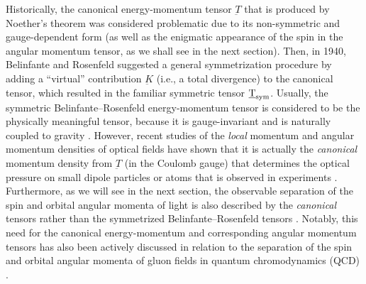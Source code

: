 \documentclass[1p,sort&compress]{elsarticle}
\numberwithin{equation}{section}
\begin{document}
Historically, the canonical energy-momentum tensor $\underbar{T}$ that is produced by Noether's theorem was considered problematic due to its non-symmetric and gauge-dependent form (as well as the enigmatic appearance of the spin in the angular momentum tensor, as we shall see in the next section).  Then, in 1940, Belinfante and Rosenfeld \cite{Belinfante1939,Belinfante1940,Rosenfeld1940} suggested a general symmetrization procedure by adding a ``virtual'' contribution $\underbar{K}$ (i.e., a total divergence) to the canonical tensor, which resulted in the familiar symmetric tensor $\underbar{T}_{\rm sym}$. Usually, the symmetric Belinfante--Rosenfeld energy-momentum tensor is considered to be the physically meaningful tensor, because it is gauge-invariant and is naturally coupled to gravity \cite{Soper1976}. However, recent studies of the \emph{local} momentum and angular momentum densities of optical fields have shown that it is actually the \emph{canonical} momentum density from $\underbar{T}$ (in the Coulomb gauge) that determines the optical pressure on small dipole particles or atoms that is observed in experiments \cite{O'Neil2002,Garces2003,Curtis2003,Huard1978,Huard1979,Kocsis2011,Arlt2003,Leach2006,Yeganeh2013,Bliokh2013,Bliokh2013a,Barnett2013,Bliokh2013b,Bliokh2013c, Bekshaev2014}. Furthermore, as we will see in the next section, the observable separation of the spin and orbital angular momenta of light \cite{Allen1992,Allen1999,Andrews2008,Torres2011,Andrews2013,O'Neil2002,Garces2003,Curtis2003, Zhao2007,Adachi2007} is also described by the \emph{canonical} tensors rather than the symmetrized Belinfante--Rosenfeld tensors \cite{Bliokh2013,Bliokh2014}. Notably, this need for the canonical energy-momentum and corresponding angular momentum tensors has also been actively discussed in relation to the separation of the spin and orbital angular momenta of gluon fields in quantum chromodynamics (QCD) \cite{Leader2014}.
\end{document}
